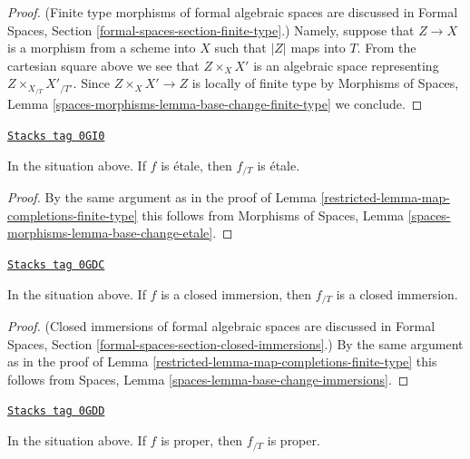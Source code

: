 \begin{proof}
(Finite type morphisms of formal algebraic spaces are discussed in
Formal Spaces, Section \ref{formal-spaces-section-finite-type}.)
Namely, suppose that $Z \to X$ is a morphism from a scheme into $X$ such
that $|Z|$ maps into $T$. From the cartesian square above we see that
$Z \times_X X'$ is an algebraic space representing
$Z \times_{X_{/T}} X'_{/T'}$. Since $Z \times_X X' \to Z$
is locally of finite type by Morphisms of Spaces, Lemma
\ref{spaces-morphisms-lemma-base-change-finite-type} we conclude.
\end{proof}

\begin{lemma}
\label{restricted-lemma-map-completions-etale}
\href{https://stacks.math.columbia.edu/tag/0GI0}{\texttt{Stacks tag 0GI0}}

In the situation above. If $f$ is \'etale, then $f_{/T}$ is \'etale.
\end{lemma}

\begin{proof}

By the same argument as in the proof of
Lemma \ref{restricted-lemma-map-completions-finite-type} this follows from
Morphisms of Spaces, Lemma \ref{spaces-morphisms-lemma-base-change-etale}.
\end{proof}

\begin{lemma}
\label{restricted-lemma-closed-immersion-gives-closed-immersion}
\href{https://stacks.math.columbia.edu/tag/0GDC}{\texttt{Stacks tag 0GDC}}

In the situation above. If $f$ is a closed immersion, then
$f_{/T}$ is a closed immersion.
\end{lemma}

\begin{proof}

(Closed immersions of formal algebraic spaces are discussed in
Formal Spaces, Section
\ref{formal-spaces-section-closed-immersions}.)
By the same argument as in the proof of
Lemma \ref{restricted-lemma-map-completions-finite-type} this follows from
Spaces, Lemma
\ref{spaces-lemma-base-change-immersions}.
\end{proof}

\begin{lemma}
\label{restricted-lemma-proper-gives-proper}
\href{https://stacks.math.columbia.edu/tag/0GDD}{\texttt{Stacks tag 0GDD}}

In the situation above. If $f$ is proper, then $f_{/T}$ is proper.
\end{lemma}

